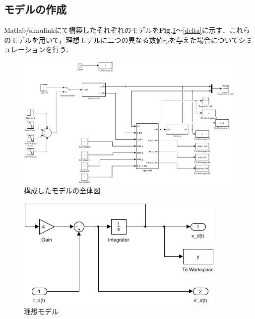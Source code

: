 \documentclass[a4paper,12pt]{jarticle}
\begin{document}
\subsection{モデルの作成}
Matlab/simulinkにて構築したそれぞれのモデルを{\bf Fig.}{\ref{structured_model}}〜{\ref{delta}}に示す．これらのモデルを用いて，理想モデルに二つの異なる数値$ r_d $を与えた場合についてシミュレーションを行う．
\begin{figure}[H]
 \begin{center}
  \includegraphics[scale=0.6]{../figure/fig/structured_model.png}
  \caption{構成したモデルの全体図}
  \label{structured_model}
 \end{center}
\end{figure}
\begin{figure}[H]
 \begin{center}
  \includegraphics[scale=0.6]{../figure/fig/ideal_model.png}
  \caption{理想モデル}
  \label{ideal_model}
 \end{center}
\end{figure}
\end{document}
